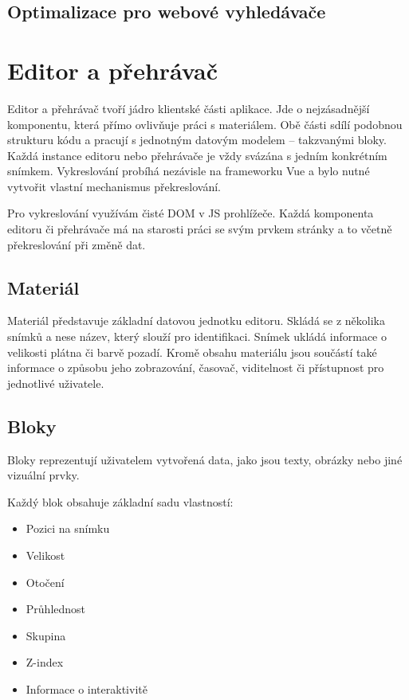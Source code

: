 
\subsection{Optimalizace pro webové vyhledávače}

\section{Editor a přehrávač}\label{text:realizace/editor}

Editor a přehrávač tvoří jádro klientské části aplikace. 
Jde o nejzásadnější komponentu, která přímo ovlivňuje práci s materiálem. 
Obě části sdílí podobnou strukturu kódu a pracují s jednotným datovým modelem -- takzvanými bloky. 
Každá instance editoru nebo přehrávače je vždy svázána s jedním konkrétním snímkem. 
Vykreslování probíhá nezávisle na frameworku Vue a bylo nutné vytvořit vlastní mechanismus překreslování.

Pro vykreslování využívám čisté DOM v JS prohlížeče.
Každá komponenta editoru či přehrávače má na starosti práci se svým prvkem stránky a to včetně překreslování při změně dat.

\subsection{Materiál}

Materiál představuje základní datovou jednotku editoru.
Skládá se z několika snímků a nese název, který slouží pro identifikaci. 
Snímek ukládá informace o velikosti plátna či barvě pozadí.
Kromě obsahu materiálu jsou součástí také informace o způsobu jeho zobrazování, časovač, viditelnost či přístupnost pro jednotlivé uživatele.

\subsection{Bloky}

Bloky reprezentují uživatelem vytvořená data, jako jsou texty, obrázky nebo jiné vizuální prvky. 

Každý blok obsahuje základní sadu vlastností: 

\begin{itemize}
	\item Pozici na snímku
	\item Velikost
	\item Otočení
	\item Průhlednost
	\item Skupina
	\item Z-index
	\item Informace o interaktivitě
\end{itemize}

